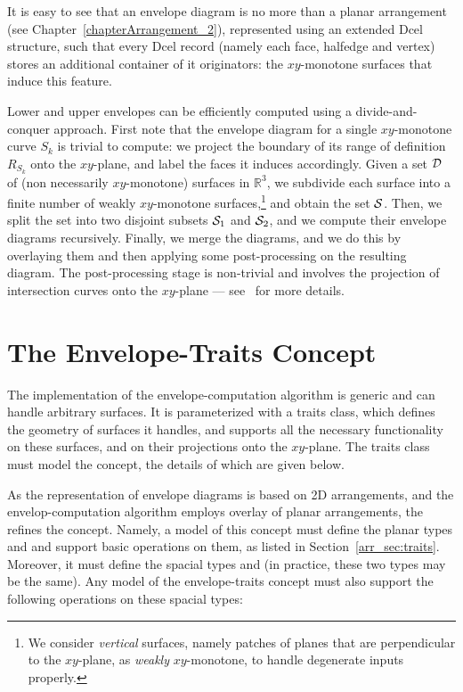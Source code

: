 It is easy to see that an envelope diagram is no more than a planar
arrangement (see Chapter~\ref{chapterArrangement_2}), represented
using an extended {\sc Dcel} structure, such that every {\sc Dcel}
record (namely each face, halfedge and vertex) stores an additional
container of it originators: the $xy$-monotone surfaces that induce
this feature.

Lower and upper envelopes can be efficiently computed using a
divide-and-conquer approach. First note that the envelope diagram for
a single $xy$-monotone curve $S_k$ is trivial to compute: we project
the boundary of its range of definition $R_{S_k}$ onto the $xy$-plane,
and label the faces it induces accordingly. Given a set ${\cal D}$
of (non necessarily $xy$-monotone) surfaces in ${\mathbb R}^3$, we subdivide
each surface into a finite number of weakly $xy$-monotone 
surfaces,\footnote{We consider {\em vertical} surfaces, namely patches 
of planes that are perpendicular to the $xy$-plane, as {\em weakly} 
$xy$-monotone, to handle degenerate inputs properly.} and obtain the 
set ${\cal S}$. Then, we split the set into two disjoint subsets ${\cal S}_1$
and ${\cal S}_2$, and we compute their envelope diagrams recursively.
Finally, we merge the diagrams, and we do this by overlaying them and 
then applying some post-processing on the resulting diagram. The 
post-processing stage is non-trivial and involves the projection of 
intersection curves onto the $xy$-plane --- see~\cite{cgal:m-rgece-06}
for more details.

\section{The Envelope-Traits Concept}

The implementation of the envelope-computation algorithm is generic and
can handle arbitrary surfaces. It is parameterized with a traits class,
which defines the geometry of surfaces it handles, and supports all
the necessary functionality on these surfaces, and on their projections 
onto the $xy$-plane. The traits class must model the 
 concept, the details of which are given below.

As the representation of envelope diagrams is based on 2D
arrangements, and the envelop-computation algorithm employs overlay
of planar arrangements, the  refines the
 concept. Namely, a model of this 
concept must define the planar types  and 
 and support basic operations on them, as 
listed in Section~\ref{arr_sec:traits}. Moreover, it must define the 
spacial types  and  (in practice,
these two types may be the same). Any model of the envelope-traits
concept must also support the following operations on these spacial
types:

